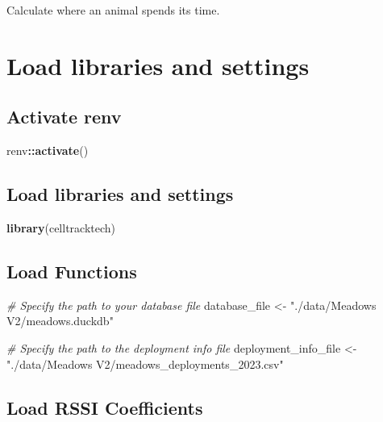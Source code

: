 \documentclass[
]{book}
\newenvironment{Shaded}{\begin{snugshade}}{\end{snugshade}}
\newcommand{\CommentTok}[1]{\textcolor[rgb]{0.56,0.35,0.01}{\textit{#1}}}
\newcommand{\FunctionTok}[1]{\textcolor[rgb]{0.13,0.29,0.53}{\textbf{#1}}}
\newcommand{\NormalTok}[1]{#1}
\newcommand{\OtherTok}[1]{\textcolor[rgb]{0.56,0.35,0.01}{#1}}
\newcommand{\SpecialCharTok}[1]{\textcolor[rgb]{0.81,0.36,0.00}{\textbf{#1}}}
\newcommand{\StringTok}[1]{\textcolor[rgb]{0.31,0.60,0.02}{#1}}
\begin{document}
Calculate where an animal spends its time.

\section{Load libraries and settings}\label{load-libraries-and-settings}

\subsection{Activate renv}\label{activate-renv}

\begin{Shaded}
\begin{Highlighting}[]
\NormalTok{renv}\SpecialCharTok{::}\FunctionTok{activate}\NormalTok{()}
\end{Highlighting}
\end{Shaded}

\subsection{Load libraries and settings}\label{load-libraries-and-settings-1}

\begin{Shaded}
\begin{Highlighting}[]
\FunctionTok{library}\NormalTok{(celltracktech)}
\end{Highlighting}
\end{Shaded}

\subsection{Load Functions}\label{load-functions}

\begin{Shaded}
\begin{Highlighting}[]
\CommentTok{\# Specify the path to your database file}
\NormalTok{database\_file }\OtherTok{\textless{}{-}} \StringTok{"./data/Meadows V2/meadows.duckdb"}

\CommentTok{\# Specify the path to the deployment info file}
\NormalTok{deployment\_info\_file }\OtherTok{\textless{}{-}} \StringTok{"./data/Meadows V2/meadows\_deployments\_2023.csv"}
\end{Highlighting}
\end{Shaded}

\subsection{Load RSSI Coefficients}\label{load-rssi-coefficients}
\end{document}

